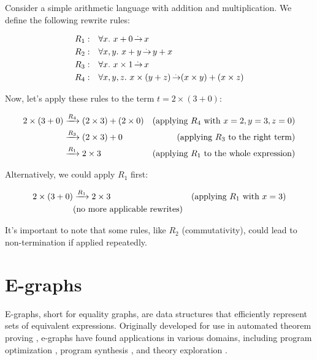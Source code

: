 \begin{example}
\label{perlim:rewriting_example}
Consider a simple arithmetic language with addition and multiplication. We define the following rewrite rules:

\begin{align*}
R_1:& \quad \forall x.~x + 0 \operatorname{\overset{.\,}{\rightarrow}} x \\
R_2:& \quad \forall x, y.~x + y \operatorname{\overset{.\,}{\rightarrow}} y + x \\
R_3:& \quad \forall x.~x \times 1 \operatorname{\overset{.\,}{\rightarrow}} x \\
R_4:& \quad \forall x, y, z.~x \times (y + z) \operatorname{\overset{.\,}{\rightarrow}} (x \times y) + (x \times z)
\end{align*}

Now, let's apply these rules to the term $t = 2 \times (3 + 0)$:

\begin{align*}
2 \times (3 + 0) &\xrightarrow[]{R_4} (2 \times 3) + (2 \times 0) &\text{(applying $R_4$ with $x = 2, y = 3, z = 0$)} \\
                 &\xrightarrow[]{R_3} (2 \times 3) + 0 &\text{(applying $R_3$ to the right term)} \\
                 &\xrightarrow[]{R_1} 2 \times 3 &\text{(applying $R_1$ to the whole expression)}
\end{align*}

Alternatively, we could apply $R_1$ first:

\begin{align*}
2 \times (3 + 0) &\xrightarrow[]{R_1} 2 \times 3 &\text{(applying $R_1$ with $x = 3$)} \\
                 &\text{(no more applicable rewrites)} \\
\end{align*}

It's important to note that some rules, like $R_2$ (commutativity), could lead to non-termination if applied repeatedly.
\end{example}

\section{E-graphs}
\label{perlims:e-graphs}

E-graphs, short for equality graphs, are data structures that efficiently represent sets of equivalent expressions. 
Originally developed for use in automated theorem proving \cite{egraphsnelson1980fast}, e-graphs have found applications in various domains, including program optimization \cite{eqsat}, program synthesis \cite{herbie}, and theory exploration \cite{thesy}.


